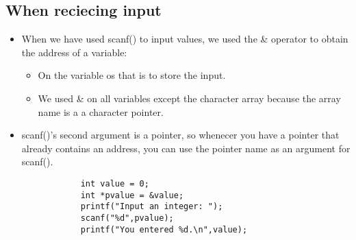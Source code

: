 \subsection{When reciecing input}
\begin{itemize}
    \item When we have used scanf() to input values, we used the \& operator to obtain the address of a variable:
        \begin{itemize}
            \item On the variable os that is to store the input. 
            \item We used \& on all variables except the character array because the array name is a a character pointer. 
        \end{itemize}
    \item scanf()'s second argument is a pointer, so whenecer you have a pointer that already contains an address, you can use the pointer name as an argument for scanf(). 
        \begin{verbatim}
            int value = 0; 
            int *pvalue = &value; 
            printf("Input an integer: ");
            scanf("%d",pvalue); 
            printf("You entered %d.\n",value); 
        \end{verbatim}
    
\end{itemize}

